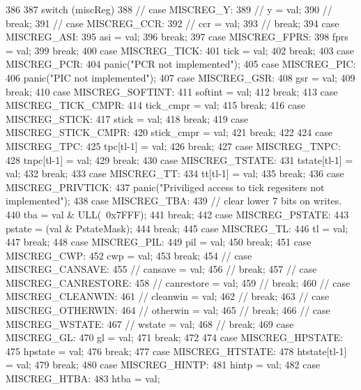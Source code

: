 \begin{DoxyCode}
386 {
387     switch (miscReg) {
388 //      case MISCREG_Y:
389 //        y = val;
390 //        break;
391 //      case MISCREG_CCR:
392 //        ccr = val;
393 //        break;
394       case MISCREG_ASI:
395         asi = val;
396         break;
397       case MISCREG_FPRS:
398         fprs = val;
399         break;
400       case MISCREG_TICK:
401         tick = val;
402         break;
403       case MISCREG_PCR:
404         panic("PCR not implemented\n");
405       case MISCREG_PIC:
406         panic("PIC not implemented\n");
407       case MISCREG_GSR:
408         gsr = val;
409         break;
410       case MISCREG_SOFTINT:
411         softint = val;
412         break;
413       case MISCREG_TICK_CMPR:
414         tick_cmpr = val;
415         break;
416       case MISCREG_STICK:
417         stick = val;
418         break;
419       case MISCREG_STICK_CMPR:
420         stick_cmpr = val;
421         break;
422 
424       case MISCREG_TPC:
425         tpc[tl-1] = val;
426         break;
427       case MISCREG_TNPC:
428         tnpc[tl-1] = val;
429         break;
430       case MISCREG_TSTATE:
431         tstate[tl-1] = val;
432         break;
433       case MISCREG_TT:
434         tt[tl-1] = val;
435         break;
436       case MISCREG_PRIVTICK:
437         panic("Priviliged access to tick regesiters not implemented\n");
438       case MISCREG_TBA:
439         // clear lower 7 bits on writes.
440         tba = val & ULL(~0x7FFF);
441         break;
442       case MISCREG_PSTATE:
443         pstate = (val & PstateMask);
444         break;
445       case MISCREG_TL:
446         tl = val;
447         break;
448       case MISCREG_PIL:
449         pil = val;
450         break;
451       case MISCREG_CWP:
452         cwp = val;
453         break;
454 //      case MISCREG_CANSAVE:
455 //        cansave = val;
456 //        break;
457 //      case MISCREG_CANRESTORE:
458 //        canrestore = val;
459 //        break;
460 //      case MISCREG_CLEANWIN:
461 //        cleanwin = val;
462 //        break;
463 //      case MISCREG_OTHERWIN:
464 //        otherwin = val;
465 //        break;
466 //      case MISCREG_WSTATE:
467 //        wstate = val;
468 //        break;
469       case MISCREG_GL:
470         gl = val;
471         break;
472 
474       case MISCREG_HPSTATE:
475         hpstate = val;
476         break;
477       case MISCREG_HTSTATE:
478         htstate[tl-1] = val;
479         break;
480       case MISCREG_HINTP:
481         hintp = val;
482       case MISCREG_HTBA:
483         htba = val;
}}
\end{DoxyCode}
